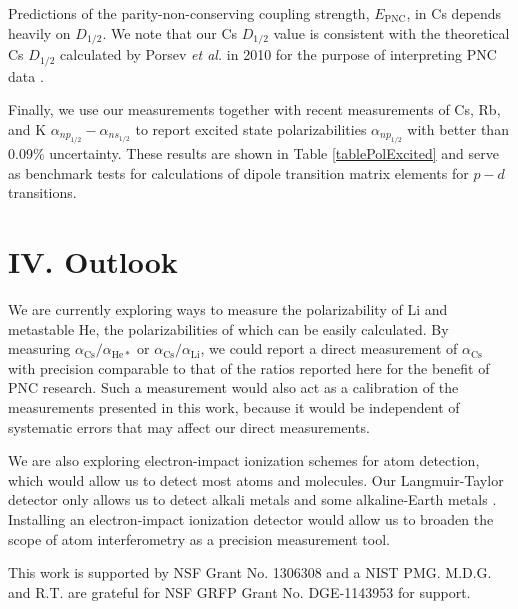 \documentclass[twocolumn,pra,showpacs,superscriptaddress,longbibliography]{revtex4-1}   %
\newcommand{\acs}{\alpha_{\textrm{Cs}}}
\newcommand{\etalspace}{\textit{et al. }}
\begin{document}
Predictions of the parity-non-conserving coupling strength, $E_{\mathrm{PNC}}$, in Cs depends heavily on $D_{1/2}$.
We note that our Cs $D_{1/2}$ value is consistent with the theoretical Cs $D_{1/2}$ calculated by Porsev \etalspace in 2010 for the purpose of interpreting PNC data \cite{Porsev2010}.


Finally, we use our measurements together with recent measurements of Cs, Rb, and K $\alpha_{np_{1/2}} - \alpha_{ns_{1/2}}$ \cite{Hunter1991,Miller1994} to report excited state polarizabilities $\alpha_{np_{1/2}}$ with better than 0.09\% uncertainty. 
These results are shown in Table \ref{tablePolExcited} and serve as benchmark tests for calculations of dipole transition matrix elements for $p-d$ transitions.

\section{IV. Outlook}

We are currently exploring ways to measure the polarizability of Li and metastable He, the polarizabilities of which can be easily calculated. By measuring $\acs/\alpha_{\mathrm{He*}}$ or $\acs/\alpha_{\mathrm{Li}}$, we could report a direct measurement of $\acs$ with precision comparable to that of the ratios reported here for the benefit of PNC research. Such a measurement would also act as a calibration of the measurements presented in this work, because it would be independent of systematic errors that may affect our direct measurements.

We are also exploring electron-impact ionization schemes for atom detection, which would allow us to detect most atoms and molecules. Our Langmuir-Taylor detector only allows us to detect alkali metals and some alkaline-Earth metals \cite{Delhuille2002}. Installing an electron-impact ionization detector would allow us to broaden the scope of atom interferometry as a precision measurement tool. 

This work is supported by NSF Grant No. 1306308 and a NIST PMG. M.D.G. and R.T. are grateful for NSF GRFP Grant No. DGE-1143953 for support. 

%
%

\end{document}

